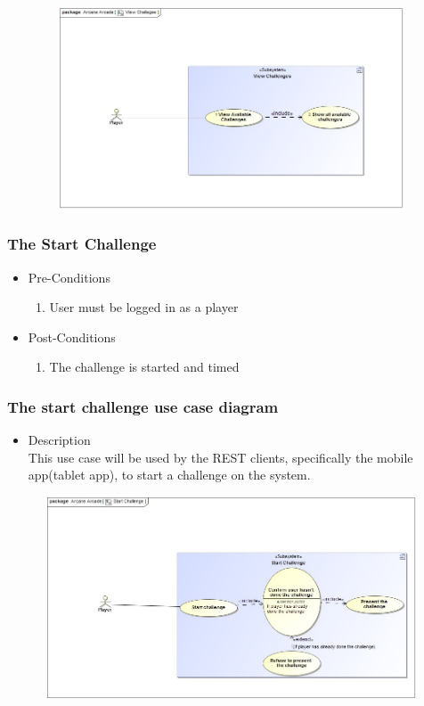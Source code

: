 \documentclass[english]{article}
\begin{document}
	
		\includegraphics[width=14cm,height=6cm,keepaspectratio]{viewChallenge.jpg}
		
		\subsubsection{The Start Challenge}
		
			\begin{itemize}
	
		
		\item Pre-Conditions
			\begin{enumerate}
				
				\item User must be logged in as a player
			\end{enumerate}
		\item Post-Conditions 
			\begin{enumerate}
			\item The challenge is started and timed
						
			\end{enumerate}
	

		\end{itemize}
		
		
		\subsubsection* {The start challenge use case diagram}
		\begin{itemize}
			\item Description\\
			This use case will be used by the REST clients, specifically the mobile app(tablet app), to start a challenge on the system.
		\end{itemize}
		
	
		\includegraphics[width=14cm,height=6cm,keepaspectratio]{startChallenge.jpg}
		
\end{document}
